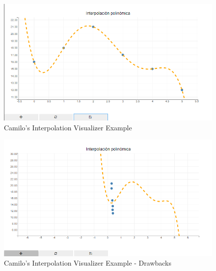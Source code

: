 \begin{figure}[H]
    \centering
    \includegraphics[width=\textwidth]{Include/Images/Thesis/Development/Visualizers/INTERPOLATION VISUALIZER/Camilo.Interpolation.Ex1.png}
    \caption{Camilo's Interpolation Visualizer Example}
    \label{fig:Camilo's Interpolation Visualizer Example}
\end{figure}

\begin{figure}[H]
    \centering
    \includegraphics[width=\textwidth]{Include/Images/Thesis/Development/Visualizers/INTERPOLATION VISUALIZER/Camilo.Interpolation.Ex1.1.png}
    \caption{Camilo's Interpolation Visualizer Example - Drawbacks}
    \label{fig:Camilo's Interpolation Visualizer Example - Drawbacks}
\end{figure}


